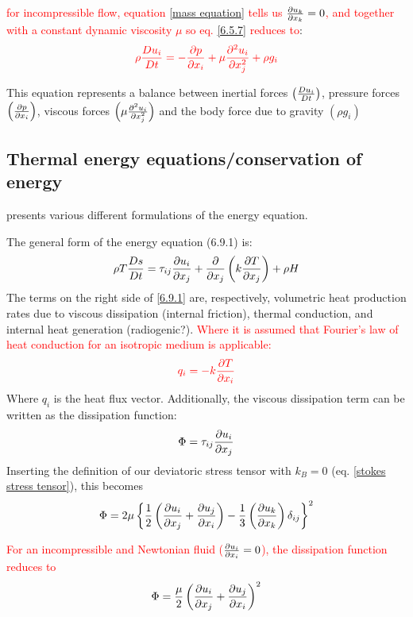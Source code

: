 \documentclass[document.tex]{subfiles}
\begin{document}
\textcolor{red}{for incompressible flow, equation \ref{mass equation} tells us $\pdv{u_k}{x_k} =0$, 
and together with a constant dynamic viscosity $\mu$ so eq. \ref{6.5.7} reduces to}: 
\begin{align}
    \color{red}
    \rho \frac{D u_i}{D t} = - \pdv{p}{x_i} + \mu \pdv[2]{u_i}{x_j} + \rho g_i
\end{align}

This equation represents a balance between inertial forces $\left(\frac{D u_i}{D t}\right)$, pressure 
forces $\left(\pdv{p}{x_i}\right)$, viscous forces $\left(\mu \pdv[2]{u_i}{x_j}\right)$ 
and the body force due to gravity $\left(\rho g_i\right)$

\subsection{Thermal energy equations/conservation of energy}
\cite{scto01} presents various different formulations of the energy equation.

The general form of the energy equation (6.9.1) is:
\begin{equation} \label{6.9.1}
    \rho T \frac{D s}{D t} = \tau_{ij}\pdv{u_i}{x_j} + \pdv{}{x_j}\left(k\pdv{T}{x_j}\right) + \rho H 
\end{equation}
The terms on the right side of \ref{6.9.1} are, respectively, volumetric heat production rates due 
to viscous dissipation (internal friction), thermal conduction, and internal heat generation (radiogenic?). 
\textcolor{red}{Where it is assumed that Fourier's law of heat conduction for an isotropic medium is applicable:}
\begin{align}
    \color{red}
    q_i = -k \pdv{T}{x_i}
\end{align}
Where $q_i$ is the heat flux vector. Additionally, the viscous dissipation term can be written 
as the dissipation function: 
\begin{align} \label{dissipation function}
    \Phi = \tau_{ij} \pdv{u_i}{x_j}
\end{align}
Inserting the definition of our deviatoric stress tensor with $k_B = 0$ (eq. \ref{stokes stress tensor}), this becomes
\begin{align} \label{6.9.4}
    \Phi = 2\mu \left\{\frac{1}{2}\left(\pdv{u_i}{x_j} + \pdv{u_j}{x_i}\right)
    - \frac{1}{3}\left(\pdv{u_k}{x_k}\right)\delta_{ij}\right\}^2
\end{align}

\textcolor{red}{For an incompressible and Newtonian fluid ($\pdv{u_i}{x_i} = 0$), the dissipation function reduces to}
{\color{red}
\begin{align}
    \Phi = \frac{\mu}{2}\left(\pdv{u_i}{x_j} + \pdv{u_j}{x_i}\right)^2
\end{align}
}
\end{document}
